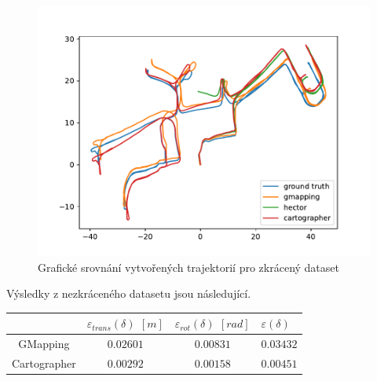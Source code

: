 \documentclass[12pt]{report}
\begin{document}
\begin{figure}[!ht]
	\begin{center}
		\includegraphics[width=0.7\columnwidth]{imgs/mit_short.pdf}
	\end{center}
	\caption{Grafické srovnání vytvořených trajektorií pro zkrácený dataset}
	\label{fig:mit_short}
\end{figure}

\noindent Výsledky z nezkráceného datasetu jsou následující.\\
\begin{center}
	\begin{tabular}{c|ccp{3cm}}
		\bfseries \bfseries  & $\varepsilon_{trans}(\delta)$ $[m]$ & $\varepsilon_{rot}(\delta)$ $[rad]$ & $\varepsilon(\delta)$ \\ [2mm]
		\hline
		GMapping & $0.02601$ & $0.00831$ & $0.03432$ \\ 
		Cartographer & $0.00292$ & $0.00158$ & $0.00451$ \\
	\end{tabular}
\end{center}
\end{document}
